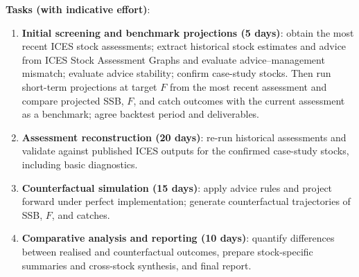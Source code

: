\documentclass[11pt,a4paper]{extarticle}
\begin{document}
\textbf{Tasks (with indicative effort)}:
\begin{enumerate}
	\item \textbf{Initial screening and benchmark projections (5 days)}:
	obtain the most recent ICES stock assessments; extract historical stock
	estimates and advice from ICES Stock Assessment Graphs and evaluate
	advice--management mismatch; evaluate advice stability; confirm case-study
	stocks. Then run short-term projections at target $F$ from the most recent
	assessment and compare projected SSB, $F$, and catch outcomes with the
	current assessment as a benchmark; agree backtest period and deliverables.
	
	\item \textbf{Assessment reconstruction (20 days)}:
	re-run historical assessments and validate against published ICES outputs
	for the confirmed case-study stocks, including basic diagnostics.
	
	\item \textbf{Counterfactual simulation (15 days)}:
	apply advice rules and project forward under perfect implementation;
	generate counterfactual trajectories of SSB, $F$, and catches.
	
	\item \textbf{Comparative analysis and reporting (10 days)}:
	quantify differences between realised and counterfactual outcomes, prepare
	stock-specific summaries and cross-stock synthesis, and final report.
\end{enumerate}

	
\end{document}
